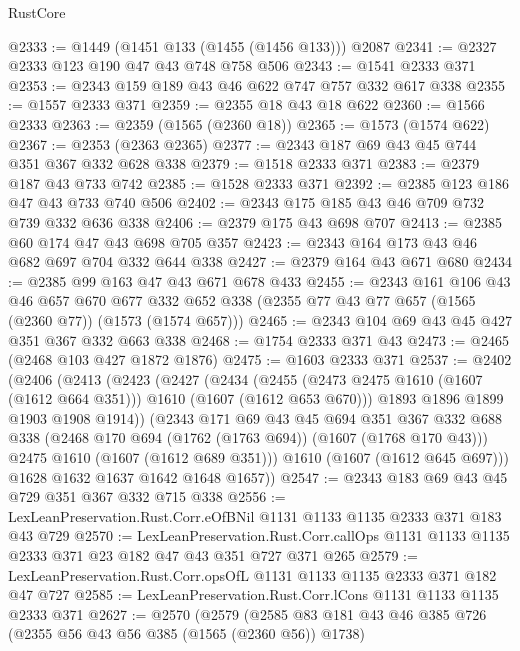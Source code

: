 \begin{lexlean}{RustCore}
\begin{coremodule}
@2333 := @1449 (@1451 @133 (@1455 (@1456 @133))) @2087
@2341 := @2327 @2333 @123 @190 @47 @43 @748 @758 @506
@2343 := @1541 @2333 @371
@2353 := @2343 @159 @189 @43 @46 @622 @747 @757 @332 @617 @338
@2355 := @1557 @2333 @371
@2359 := @2355 @18 @43 @18 @622
@2360 := @1566 @2333
@2363 := @2359 (@1565 (@2360 @18))
@2365 := @1573 (@1574 @622)
@2367 := @2353 (@2363 @2365)
@2377 := @2343 @187 @69 @43 @45 @744 @351 @367 @332 @628 @338
@2379 := @1518 @2333 @371
@2383 := @2379 @187 @43 @733 @742
@2385 := @1528 @2333 @371
@2392 := @2385 @123 @186 @47 @43 @733 @740 @506
@2402 := @2343 @175 @185 @43 @46 @709 @732 @739 @332 @636 @338
@2406 := @2379 @175 @43 @698 @707
@2413 := @2385 @60 @174 @47 @43 @698 @705 @357
@2423 := @2343 @164 @173 @43 @46 @682 @697 @704 @332 @644 @338
@2427 := @2379 @164 @43 @671 @680
@2434 := @2385 @99 @163 @47 @43 @671 @678 @433
@2455 := @2343
    @161
    @106
    @43
    @46
    @657
    @670
    @677
    @332
    @652
    @338
    (@2355 @77 @43 @77 @657 (@1565 (@2360 @77)) (@1573 (@1574 @657)))
@2465 := @2343 @104 @69 @43 @45 @427 @351 @367 @332 @663 @338
@2468 := @1754 @2333 @371 @43
@2473 := @2465 (@2468 @103 @427 @1872 @1876)
@2475 := @1603 @2333 @371
@2537 := @2402
    (@2406
      (@2413
        (@2423
          (@2427
            (@2434
              (@2455 (@2473 @2475 @1610 (@1607 (@1612 @664 @351))) @1610 (@1607 (@1612 @653 @670)))
              @1893
              @1896
              @1899
              @1903
              @1908
              @1914))
          (@2343
            @171
            @69
            @43
            @45
            @694
            @351
            @367
            @332
            @688
            @338
            (@2468 @170 @694 (@1762 (@1763 @694)) (@1607 (@1768 @170 @43)))
            @2475
            @1610
            (@1607 (@1612 @689 @351)))
          @1610
          (@1607 (@1612 @645 @697)))
        @1628
        @1632
        @1637
        @1642
        @1648
        @1657))
@2547 := @2343 @183 @69 @43 @45 @729 @351 @367 @332 @715 @338
@2556 := LexLeanPreservation.Rust.Corr.eOfBNil @1131 @1133 @1135 @2333 @371 @183 @43 @729
@2570 := LexLeanPreservation.Rust.Corr.callOps
    @1131
    @1133
    @1135
    @2333
    @371
    @23
    @182
    @47
    @43
    @351
    @727
    @371
    @265
@2579 := LexLeanPreservation.Rust.Corr.opsOfL @1131 @1133 @1135 @2333 @371 @182 @47 @727
@2585 := LexLeanPreservation.Rust.Corr.lCons @1131 @1133 @1135 @2333 @371
@2627 := @2570
    (@2579
      (@2585
        @83
        @181
        @43
        @46
        @385
        @726
        (@2355 @56 @43 @56 @385 (@1565 (@2360 @56)) @1738)

\end{coremodule}
\end{lexlean}
